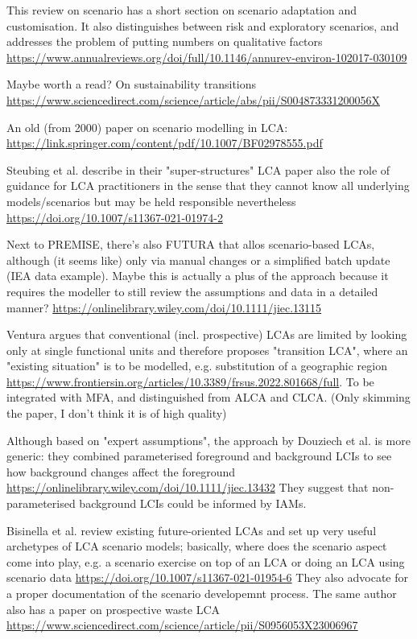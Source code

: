 \documentclass{article}
\begin{document}
This review on scenario has a short section on scenario adaptation and customisation. It also distinguishes between risk and exploratory scenarios, and addresses the problem of putting numbers on qualitative factors \url{https://www.annualreviews.org/doi/full/10.1146/annurev-environ-102017-030109}

Maybe worth a read? On sustainability transitions \url{https://www.sciencedirect.com/science/article/abs/pii/S004873331200056X}

An old (from 2000) paper on scenario modelling in LCA: \url{https://link.springer.com/content/pdf/10.1007/BF02978555.pdf}

Steubing et al. describe in their "super-structures" LCA paper also the role of guidance for LCA practitioners in the sense that they cannot know all underlying models/scenarios but may be held responsible nevertheless \url{https://doi.org/10.1007/s11367-021-01974-2}

Next to PREMISE, there's also FUTURA that allos scenario-based LCAs, although (it seems like) only via manual changes or a simplified batch update (IEA data example). Maybe this is actually a plus of the approach because it requires the modeller to still review the assumptions and data in a detailed manner? \url{https://onlinelibrary.wiley.com/doi/10.1111/jiec.13115}

Ventura argues that conventional (incl. prospective) LCAs are limited by looking only at single functional units and therefore proposes "transition LCA", where an "existing situation" is to be modelled, e.g. substitution of a geographic region  \url{https://www.frontiersin.org/articles/10.3389/frsus.2022.801668/full}. To be integrated with MFA, and distinguished from ALCA and CLCA. (Only skimming the paper, I don't think it is of high quality)

Although based on "expert assumptions", the approach by Douziech et al. is more generic: they combined parameterised foreground and background LCIs to see how background changes affect the foreground \url{https://onlinelibrary.wiley.com/doi/10.1111/jiec.13432} They suggest that non-parameterised background LCIs could be informed by IAMs.

Bisinella et al. review existing future-oriented LCAs and set up very useful archetypes of LCA scenario models; basically, where does the scenario aspect come into play, e.g. a scenario exercise on top of an LCA or doing an LCA using scenario data \url{https://doi.org/10.1007/s11367-021-01954-6} They also advocate for a proper documentation of the scenario developemnt process. The same author also has a paper on prospective waste LCA \url{https://www.sciencedirect.com/science/article/pii/S0956053X23006967}
\end{document}
